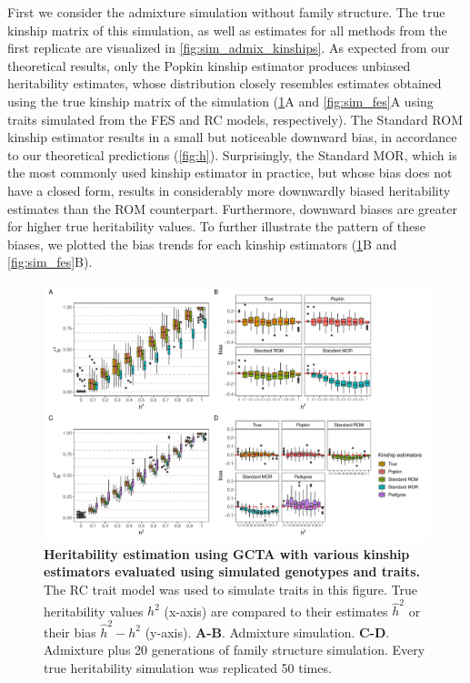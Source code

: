 \documentclass[11pt]{article}
\begin{document}
First we consider the admixture simulation without family structure.
The true kinship matrix of this simulation, as well as estimates for all methods from the first replicate are visualized in \cref{fig:sim_admix_kinships}.  
As expected from our theoretical results, only the Popkin kinship estimator produces unbiased heritability estimates, whose distribution closely resembles estimates obtained using the true kinship matrix of the simulation (\cref{fig:Herit_sim}A and \cref{fig:sim_fes}A using traits simulated from the FES and RC models, respectively).
The Standard ROM kinship estimator results in a small but noticeable downward bias, in accordance to our theoretical predictions (\cref{fig:h}).
Surprisingly, the Standard MOR, which is the most commonly used kinship estimator in practice, but whose bias does not have a closed form, results in considerably more downwardly biased heritability estimates than the ROM counterpart.
Furthermore, downward biases are greater for higher true heritability values.
To further illustrate the pattern of these biases, we plotted the bias trends for each kinship estimators (\cref{fig:Herit_sim}B and \cref{fig:sim_fes}B).  

\begin{figure}[bp!]
  \centering
  \includegraphics[width=\textwidth]{data/Fig_sim_rc.pdf}
  \caption{
    {\bf Heritability estimation using GCTA with various kinship estimators evaluated using simulated genotypes and traits.}
    The RC trait model was used to simulate traits in this figure.
    True heritability values $h^2$ (x-axis) are compared to their estimates $\hat{h}^2$ or their bias $\hat{h}^2 - h^2$ (y-axis).
    \textbf{A-B}. Admixture simulation.
    \textbf{C-D}. Admixture plus 20 generations of family structure simulation.
    Every true heritability simulation was replicated 50 times.
    }
  \label{fig:Herit_sim}
\end{figure}
\end{document}
